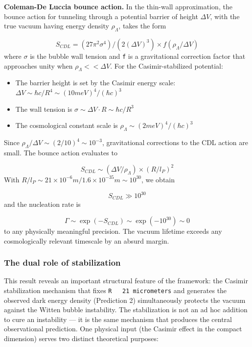 \documentclass[aps,prd,preprint,superscriptaddress,longbibliography,floatfix]{revtex4-2}
\theoremstyle{remark}
\begin{document}
\textbf{Coleman-De Luccia bounce action.} In the thin-wall approximation, the bounce action for tunneling through a potential barrier of height $\Delta V$, with the true vacuum having energy density $\rho_\Lambda$, takes the form


\begin{equation}
    S_{CDL} = (27 \pi^{2} \sigma^{4}) / (2 (\Delta V)^{3}) \times f(\rho_\Lambda / \Delta V)
\end{equation}
where $\sigma$ is the bubble wall tension and \texttt{f} is a gravitational correction factor that approaches unity when $\rho_\Lambda << \Delta V$. For the Casimir-stabilized potential:


\begin{itemize}
  \item The barrier height is set by the Casimir energy scale: $\Delta V \sim  \hbar c / R^{4} \sim  (10 meV)^{4} / (\hbar c)^{3}$
  \item The wall tension is $\sigma \sim  \Delta V \cdot R \sim  \hbar c / R^{3}$
  \item The cosmological constant scale is $\rho_\Lambda \sim  (2 meV)^{4} / (\hbar c)^{3}$
\end{itemize}

Since $\rho_\Lambda / \Delta V \sim  (2/10)^{4} \sim  10^{-3}$, gravitational corrections to the CDL action are small. The bounce action evaluates to


\begin{equation}
    S_{CDL} \sim  (\Delta V / \rho_\Lambda) \times (R / l_P)^{2}
\end{equation}
With $R / l_P \sim  21 \times 10^{-6} m / 1.6 \times 10^{-35} m \sim  10^{30}$, we obtain


\begin{equation}
    S_{CDL} \gg 10^{30}
\end{equation}
and the nucleation rate is


\begin{equation}
    \Gamma \sim  \exp(-S_{CDL}) \sim  \exp(-10^{30}) \sim  0
\end{equation}
to any physically meaningful precision. The vacuum lifetime exceeds any cosmologically relevant timescale by an absurd margin.


\subsubsection{The dual role of stabilization}

This result reveals an important structural feature of the framework: the Casimir stabilization mechanism that fixes \texttt{R ~ 21 micrometers} and generates the observed dark energy density (Prediction 2) simultaneously protects the vacuum against the Witten bubble instability. The stabilization is not an ad hoc addition to cure an instability --- it is the same mechanism that produces the central observational prediction. One physical input (the Casimir effect in the compact dimension) serves two distinct theoretical purposes:
\end{document}
